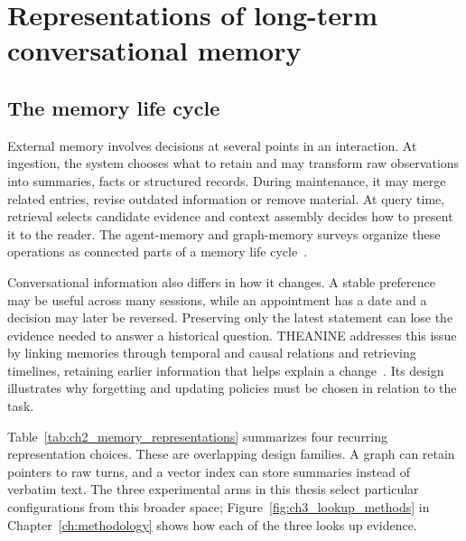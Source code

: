 \section{Representations of long-term conversational memory}
\label{sec:ch2_memory}

\subsection{The memory life cycle}

External memory involves decisions at several points in an interaction. At ingestion, the
system chooses what to retain and may transform raw observations into summaries, facts or
structured records. During maintenance, it may merge related entries, revise outdated
information or remove material. At query time, retrieval selects candidate evidence and
context assembly decides how to present it to the reader. The agent-memory and graph-memory
surveys organize these operations as connected parts of a memory life
cycle~\citep{memory_survey2024,graph_memory_survey2026}.

Conversational information also differs in how it changes. A stable preference may be
useful across many sessions, while an appointment has a date and a decision may later be
reversed. Preserving only the latest statement can lose the evidence needed to answer a
historical question. THEANINE addresses this issue by linking memories through temporal
and causal relations and retrieving timelines, retaining earlier information that helps
explain a change~\citep{theanine}. Its design illustrates why forgetting and updating
policies must be chosen in relation to the task.

Table~\ref{tab:ch2_memory_representations} summarizes four recurring representation choices.
These are overlapping design families. A graph can retain pointers to raw turns, and a
vector index can store summaries instead of verbatim text. The three experimental arms
in this thesis select particular configurations from this broader space;
Figure~\ref{fig:ch3_lookup_methods} in Chapter~\ref{ch:methodology} shows how each of the three
looks up evidence.

